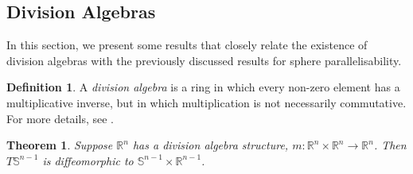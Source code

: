 \documentclass[12pt,a4paper]{article}
\numberwithin{equation}{section}
\newtheorem{theorem}{Theorem}[section]
\theoremstyle{definition}
\newtheorem{definition}{Definition}[section]
\theoremstyle{remark}
\begin{document}
\subsection{Division Algebras}
In this section, we present some results that closely relate the existence of division algebras with the previously discussed results for sphere parallelisability.
\begin{definition}
A \textit{division algebra} is a ring in which every non-zero element has a multiplicative inverse, but in which multiplication is not necessarily commutative. For more details, see \cite{MR1415833}.
\end{definition}
\begin{theorem}
Suppose $\mathbb{R}^n$ has a division algebra structure, $m:\mathbb{R}^n\times\mathbb{R}^n\to\mathbb{R}^n$. Then $T\mathbb{S}^{n-1}$ is diffeomorphic to $\mathbb{S}^{n-1}\times\mathbb{R}^{n-1}$.
\end{theorem}
\end{document}
